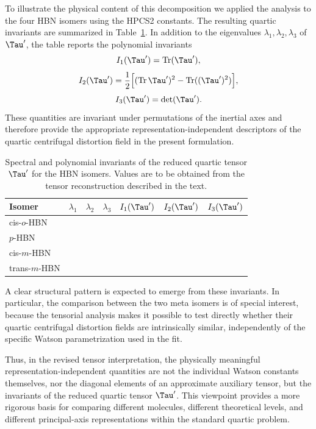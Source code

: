 To illustrate the physical content of this decomposition we applied the
analysis to the four HBN isomers using the HPCS2 constants.  The resulting
quartic invariants are summarized in Table~\ref{table:hbn_tauprime}.  In
addition to the eigenvalues $\lambda_1,\lambda_2,\lambda_3$ of $\Tau'$, the
table reports the polynomial invariants
\begin{equation}
I_1(\Tau')=\mathrm{Tr}(\Tau'),
\end{equation}
\begin{equation}
I_2(\Tau')=\frac12\Bigl[(\mathrm{Tr}\,\Tau')^2-\mathrm{Tr}((\Tau')^2)\Bigr],
\end{equation}
\begin{equation}
I_3(\Tau')=\det(\Tau').
\end{equation}
These quantities are invariant under permutations of the inertial axes and
therefore provide the appropriate representation-independent descriptors of
the quartic centrifugal distortion field in the present formulation.

\begin{table}[h]
\centering
\caption{Spectral and polynomial invariants of the reduced quartic tensor
$\Tau'$ for the HBN isomers. Values are to be obtained from the tensor
reconstruction described in the text.}

\begin{tabular}{lcccccc}
\hline
Isomer & $\lambda_1$ & $\lambda_2$ & $\lambda_3$ & $I_1(\Tau')$ & $I_2(\Tau')$ & $I_3(\Tau')$ \\
\hline
cis-$o$-HBN   &  &  &  &  &  &  \\
$p$-HBN       &  &  &  &  &  &  \\
cis-$m$-HBN   &  &  &  &  &  &  \\
trans-$m$-HBN &  &  &  &  &  &  \\
\hline
\end{tabular}

\label{table:hbn_tauprime}

\end{table}

A clear structural pattern is expected to emerge from these invariants.
In particular, the comparison between the two meta isomers is of special
interest, because the tensorial analysis makes it possible to test directly
whether their quartic centrifugal distortion fields are intrinsically similar,
independently of the specific Watson parametrization used in the fit.

Thus, in the revised tensor interpretation, the physically meaningful
representation-independent quantities are not the individual Watson constants
themselves, nor the diagonal elements of an approximate auxiliary tensor, but
the invariants of the reduced quartic tensor $\Tau'$.  This viewpoint provides
a more rigorous basis for comparing different molecules, different theoretical
levels, and different principal-axis representations within the standard
quartic problem.
